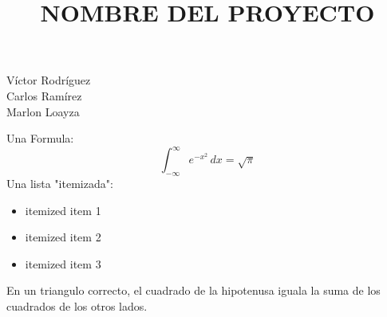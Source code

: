 \documentclass{beamer}					%
\begin{document}
	
	\begin{frame}
		\title[Swarm Intelligente]{NOMBRE DEL PROYECTO}	
		\titlepage
		\scriptsize
		\begin{center}
				Víctor Rodríguez\\
				Carlos Ramírez\\
				Marlon Loayza\\
		\end{center}
	\end{frame}	

	\begin{frame}
		Una Formula:
		\[
		\int_{-\infty}^\infty e^{-x^2} \, dx = \sqrt{\pi}
		\]
		Una lista "itemizada":
		\begin{itemize}
			\item itemized item 1
			\item itemized item 2
			\item itemized item 3
		\end{itemize}		
		\begin{theorem}
			En un triangulo correcto, el cuadrado de la hipotenusa
			iguala la suma de los cuadrados de los otros lados.
		\end{theorem}
	\end{frame}
\end{document}
